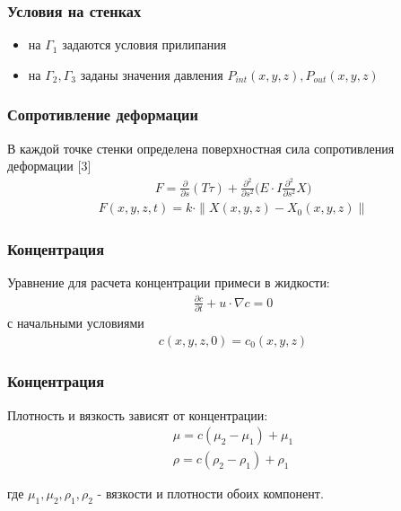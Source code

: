 \documentclass[14pt]{beamer}
\begin{document}
\begin{frame}
\frametitle{Условия на стенках}
\begin{itemize}
    \item на $\Gamma_1$ задаются условия прилипания
    \item на $\Gamma_2,\Gamma_3$ заданы значения давления $P_{int}(x, y, z),P_{out}(x, y, z)$
\end{itemize}
\end{frame}

\begin{frame}
\frametitle{Сопротивление деформации}
В каждой точке стенки определена поверхностная сила сопротивления деформации [3]
\begin{gather}
    \label{eq:strain_energy}
    F =  \frac{\partial}{\partial s}(T \tau) + \frac{\partial^2}{\partial s^2} \Big( E \cdot I \frac{\partial^2}{\partial s^2} X \Big)
\end{gather}
\begin{gather}
    \label{eq:define_boundary_force}
    F(x, y, z, t) = k \cdot \|X(x, y, z) - X_0(x, y, z)\|
\end{gather}
\end{frame}

\begin{frame}
\frametitle{Концентрация}
Уравнение для расчета концентрации примеси в жидкости:
\begin{gather}
    \label{eq:concentration}
    \frac{\partial c}{\partial t} + u \cdot \nabla c = 0
\end{gather}
с начальными условиями
\begin{gather}
    c(x, y, z, 0) = c_0(x, y, z)
\end{gather}

\end{frame}

\begin{frame}
\frametitle{Концентрация}
Плотность и вязкость зависят от концентрации:
\begin{gather}
    \label{eq:concentration_viscosity}
    \mu = c (\mu_2 - \mu_1) + \mu_1\\
    \label{eq:concentration_density}
    \rho = c (\rho_2 - \rho_1) + \rho_1
\end{gather}

где $\mu_1, \mu_2, \rho_1, \rho_2$ - вязкости и плотности обоих компонент.
\end{frame}
\end{document}

